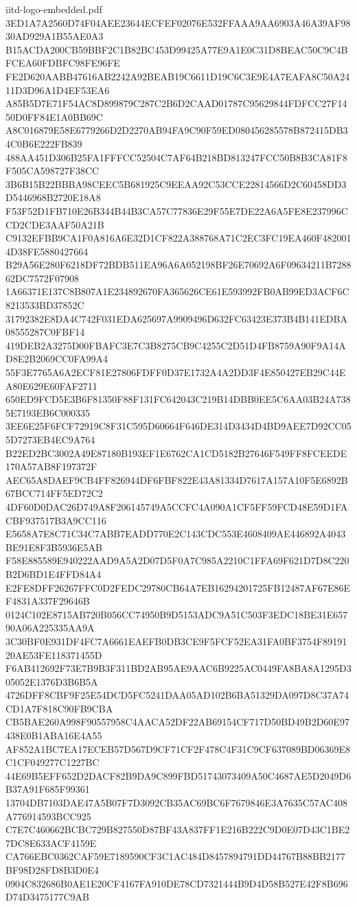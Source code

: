 \begin{filecontents*}[overwrite]{iitd-logo-embedded.pdf}
3ED1A7A2560D74F04AEE23644ECFEF02076E532FFAAA9AA6903A46A39AF9830AD929A1B55AE0A3
B15ACDA200CB59BBF2C1B82BC453D99425A77E9A1E0C31D8BEAC50C9C4BFCEA60FDBFC98FE96FE
FE2D620AABB47616AB2242A92BEAB19C6611D19C6C3E9E4A7EAFA8C50A2411D3D96A1D4EF53EA6
A85B5D7E71F54AC8D899879C287C2B6D2CAAD01787C95629844FDFCC27F1450D0FF84E1A0BB69C
A8C016879E58E6779266D2D2270AB94FA9C90F59ED080456285578B872415DB34C0B6E222FB839
488AA451D306B25FA1FFFCC52504C7AF64B218BD813247FCC50B8B3CA81F8F505CA598727F38CC
3B6B15B22BBBA98CEEC5B681925C9EEAA92C53CCE22814566D2C60458DD3D5446968B2720E18A8
F53F52D1FB710E26B344B44B3CA57C77836E29F55E7DE22A6A5FE8E237996CCD2CDE3AAF50A21B
C9132EFBB9CA1F0A816A6E32D1CF822A388768A71C2EC3FC19EA460F4820014D38FE5880427664
B29A56E280F6218DF72BDB511EA96A6A052198BF26E70692A6F09634211B728862DC7572F07908
1A66371E137C8B807A1E234892670FA365626CE61E593992FB0AB99ED3ACF6C8213533BD37852C
31792382E8DA4C742F031EDA625697A9909496D632FC63423E373B4B141EDBA08555287C0FBF14
419DEB2A3275D00FBAFC3E7C3B8275CB9C4255C2D51D4FB8759A90F9A14AD8E2B2069CC0FA99A4
55F3E7765A6A2ECF81E27806FDFF0D37E1732A4A2DD3F4E850427EB29C44EA80E629E60FAF2711
650ED9FCD5E3B6F81350F88F131FC642043C219B14DBB0EE5C6AA03B24A7385E7193EB6C000335
3EE6E25F6FCF72919C8F31C595D60664F646DE314D3434D4BD9AEE7D92CC055D7273EB4EC9A764
B22ED2BC3002A49E87180B193EF1E6762CA1CD5182B27646F549FF8FCEEDE170A57AB8F197372F
AEC65A8DAEF9CB4FF826944DF6FBF822E43A81334D7617A157A10F5E6892B67BCC714FF5ED72C2
4DF60D0DAC26D749A8F206145749A5CCFC4A090A1CF5FF59FCD48E59D1FACBF937517B3A9CC116
E5658A7E8C71C34C7ABB7EADD770E2C143CDC553E4608409AE446892A4043BE91E8F3B5936E5AB
F58E885589E940222AAD9A5A2D07D5F0A7C985A2210C1FFA69F621D7D8C220B2D6BD1E4FFD84A4
E2FE8DFF26267FFC0D2FEDC29780CB64A7EB16294201725FB12487AF67E86EF4831A337F29646B
0124C102E8715AB720B056CC74950B9D5153ADC9A51C503F3EDC18BE31E65790A06A225335AA9A
3C30BF0E931DF4FC7A6661EAEFB0DB3CE9F5FCF52EA31FA0BF3754F8919120AE53FE118371455D
F6AB412692F73E7B9B3F311BD2AB95AE9AAC6B9225AC0449FA8BA8A1295D305052E1376D3B6B5A
4726DFF8CBF9F25E54DCD5FC5241DAA05AD102B6BA51329DA097D8C37A74CD1A7F818C90FB9CBA
CB5BAE260A998F90557958C4AACA52DF22AB69154CF717D50BD49B2D60E97438E0B1ABA16E4A55
AF852A1BC7EA17ECEB57D567D9CF71CF2F478C4F31C9CF637089BD06369E8C1CF049277C1227BC
44E69B5EFF652D2DACF82B9DA9C899FBD51743073409A50C4687AE5D2049D6B37A91F685F99361
13704DB7103DAE47A5B07F7D3092CB35AC69BC6F7679846E3A7635C57AC408A776914593BCC925
C7E7C460662BCBC729B827550D87BF43A837FF1E216B222C9D0E07D43C1BE27DC8E633ACF4159E
CA766EBC0362CAF59E7189590CF3C1AC484D8457894791DD44767B88BB2177BF98D28FD8B3D0E4
0904C832686B0AE1E20CF4167FA910DE78CD7321444B9D4D58B527E42F8B696D74D3475177C9AB

\end{filecontents*}
